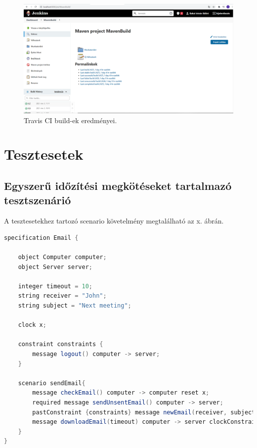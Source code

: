 \begin{figure}[!ht]
    \centering
    \includegraphics[width=150mm, keepaspectratio]{figures/jenkinsCI.png}
    \caption{Travis CI build-ek eredményei.}
\end{figure}

\clearpage\section{Tesztesetek}\subsection{Egyszerű időzítési megkötéseket tartalmazó tesztszenárió}

A tesztesetekhez tartozó scenario követelmény megtalálható az x. ábrán.

\begin{lstlisting}[language=java, frame=single, float=ht!, caption={Integrációs teszteset.},captionpos=b]
specification Email {

	object Computer computer;
	object Server server;

	integer timeout = 10;
	string receiver = "John";
	string subject = "Next meeting";

	clock x;

	constraint constraints {
		message logout() computer -> server;
	}

	scenario sendEmail{
		message checkEmail() computer -> computer reset x;
		required message sendUnsentEmail() computer -> server;
		pastConstraint {constraints} message newEmail(receiver, subject) computer -> server;
		message downloadEmail(timeout) computer -> server clockConstraint {>(x,10)};
	}
}
\end{lstlisting}

